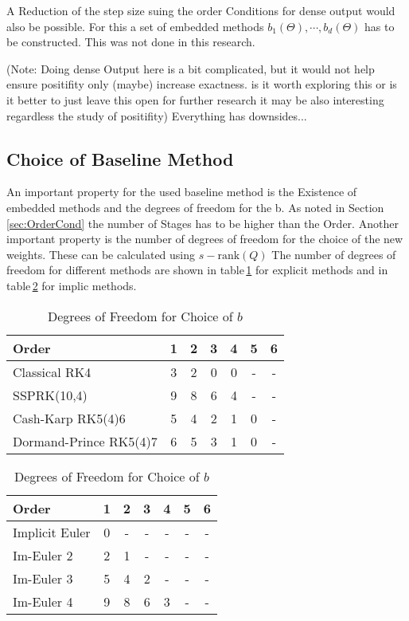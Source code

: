 \documentclass{article}
\begin{document}
A Reduction of the step size suing the order Conditions for dense output would also be possible. For this a set of embedded methods $b_1(\Theta),\cdots,b_d(\Theta)$ has to be constructed. This was not done in this research.

(Note: Doing dense Output here is a bit complicated, but it would not help ensure positifity only (maybe) increase exactness.  is it worth exploring this or is it better to just leave this open for further research it may be also interesting regardless the study of positifity)
Everything has downsides...
 


\subsection{Choice of Baseline Method}
An important property for the used baseline method is the Existence of embedded methods and the degrees of freedom for the b.
As noted in Section\,\ref{sec:OrderCond} the number of Stages has to be higher than the Order. 
Another important property is the number of degrees of freedom for the choice of the new weights. 
These can be calculated using $s-\mathrm{rank}(Q)$%
The number of degrees of freedom for different methods are shown in table\,\ref{table:DOF_exp} for explicit methods and in table\,\ref{table:DOF_imp} for implic methods.

\begin{table}[h!]
\centering    %
\begin{tabular}{|l |c c c c c c |} 
 \hline 
Order &1&2&3&4&5&6 \\ 
 \hline Classical RK4&3&2&0&0& - & -  \\ 
 SSPRK(10,4)&9&8&6&4& - & -  \\ 
 Cash-Karp RK5(4)6&5&4&2&1&0& -  \\ 
 Dormand-Prince RK5(4)7&6&5&3&1&0& -  \\ 
 \hline 
 \end{tabular}
 \caption{Degrees of Freedom for Choice of $b$} %
 \label{table:DOF_exp}
 \end{table}
 
 \begin{table}[h!]
\centering   %
 \begin{tabular}{|l |c c c c c c |} 
 \hline 
Order &1&2&3&4&5&6 \\ 
 \hline Implicit Euler&0& - & - & - & - & -  \\ 
 Im-Euler 2&2&1& - & - & - & -  \\ 
 Im-Euler 3&5&4&2& - & - & -  \\ 
 Im-Euler 4&9&8&6&3& - & -  \\ 
 \hline 
 \end{tabular}
 \caption{Degrees of Freedom for Choice of $b$} %
 \label{table:DOF_imp}
 \end{table}
\end{document}
